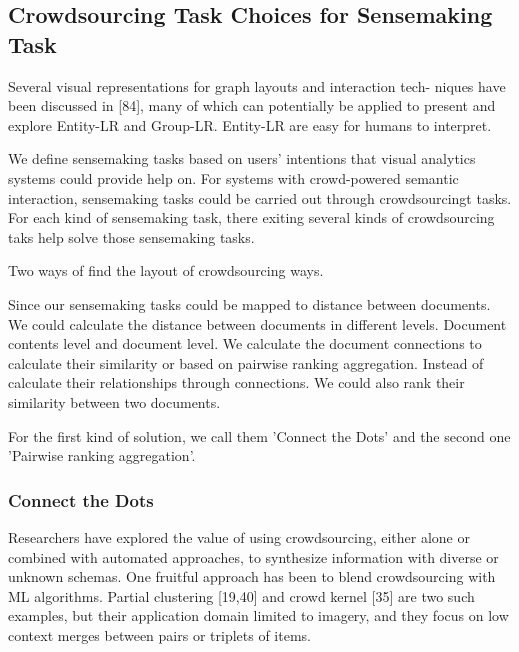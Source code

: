 \documentclass[journal]{vgtc}                %
\begin{document}
\subsection{Crowdsourcing Task Choices for Sensemaking Task}

Several visual representations for graph layouts and interaction tech- niques have been discussed in [84], many of which can potentially be applied to present and explore Entity-LR and Group-LR. Entity-LR are easy for humans to interpret.

We define sensemaking tasks based on users' intentions that visual analytics systems could provide help on.  For systems with crowd-powered semantic interaction, sensemaking tasks could be carried out through crowdsourcingt tasks. For each kind of sensemaking task, there exiting several kinds of crowdsourcing taks help solve those sensemaking tasks.

Two ways of find the layout of crowdsourcing ways.

Since our sensemaking tasks could be mapped to distance between documents. We could calculate the distance between documents in different levels. Document contents level and document level. We calculate the document connections to calculate their similarity or based on pairwise ranking aggregation. Instead of calculate their relationships through connections. We could also rank their similarity between two documents.

For the first kind of solution, we call them 'Connect the Dots' and the second one 'Pairwise ranking aggregation'.

\subsubsection{Connect the Dots}

Researchers have explored the value of using
crowdsourcing, either alone or combined with
automated approaches, to synthesize information with
diverse or unknown schemas. One fruitful approach has been to blend crowdsourcing with ML algorithms. Partial clustering [19,40] and crowd kernel [35] are two such examples, but their application domain limited to imagery, and they focus on low context merges between pairs or triplets of items.
\end{document}
